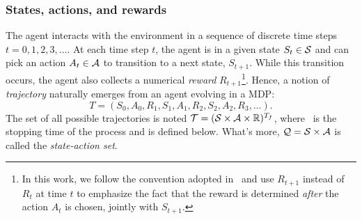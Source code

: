 			\subsubsection{States, actions, and rewards} 
				The agent interacts with the environment in a sequence of discrete time steps $t = 0, 1, 2, 3, \hdots$. At each time step $t$, the agent is in a given state $S_t \in \S$ and can pick an action $A_t \in \A$ to transition to a next state, $S_{t+1}$. While this transition occurs, the agent also collects a numerical \emph{reward} $R_{t+1}$\footnote{In this work, we follow the convention adopted in~\cite{sutton2018reinforcement} and use $R_{t+1}$ instead of $R_t$ at time $t$ to emphasize the fact that the reward is determined\emph{ after} the action $A_t$ is chosen, jointly with $S_{t+1}$.}. Hence, a notion of\emph{ trajectory} naturally emerges from an agent evolving in a MDP:
				\begin{equation*}
					T = (S_0, A_0, R_1, S_1, A_1, R_2, S_2, A_2, R_3, \hdots).
				\end{equation*}
				The set of all possible trajectories is noted $\T = (\S\times\A\times\R)^\Tf$, where \Tf~is the stopping time of the process and is defined below. What's more, $\Q = \S\times\A$ is called the\emph{ state-action set}.
